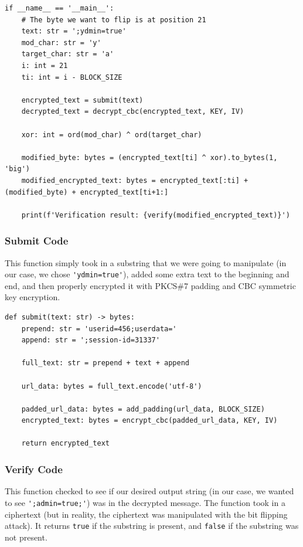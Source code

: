 \documentclass[11pt]{article}
\begin{document}
\begin{framed}
\begin{verbatim}
if __name__ == '__main__':
    # The byte we want to flip is at position 21
    text: str = ';ydmin=true'
    mod_char: str = 'y'
    target_char: str = 'a'
    i: int = 21
    ti: int = i - BLOCK_SIZE

    encrypted_text = submit(text)
    decrypted_text = decrypt_cbc(encrypted_text, KEY, IV)

    xor: int = ord(mod_char) ^ ord(target_char)

    modified_byte: bytes = (encrypted_text[ti] ^ xor).to_bytes(1, 'big')
    modified_encrypted_text: bytes = encrypted_text[:ti] + (modified_byte) + encrypted_text[ti+1:]

    print(f'Verification result: {verify(modified_encrypted_text)}')
\end{verbatim}
\end{framed}

\subsubsection*{Submit Code}

This function simply took in a substring that we were going to manipulate (in our case, we chose \verb|'ydmin=true'|), added some extra text to the beginning and end, and then properly encrypted it with PKCS\#7 padding and CBC symmetric key encryption.

\begin{framed}
\begin{verbatim}
def submit(text: str) -> bytes:
    prepend: str = 'userid=456;userdata='
    append: str = ';session-id=31337'

    full_text: str = prepend + text + append 
    
    url_data: bytes = full_text.encode('utf-8')

    padded_url_data: bytes = add_padding(url_data, BLOCK_SIZE)
    encrypted_text: bytes = encrypt_cbc(padded_url_data, KEY, IV)

    return encrypted_text
\end{verbatim}
\end{framed}

\subsubsection*{Verify Code}

This function checked to see if our desired output string (in our case, we wanted to see \verb|';admin=true;'|) was in the decrypted message. The function took in a ciphertext (but in reality, the ciphertext was manipulated with the bit flipping attack). It returns \verb|true| if the substring is present, and \verb|false| if the substring was not present.
\end{document}
